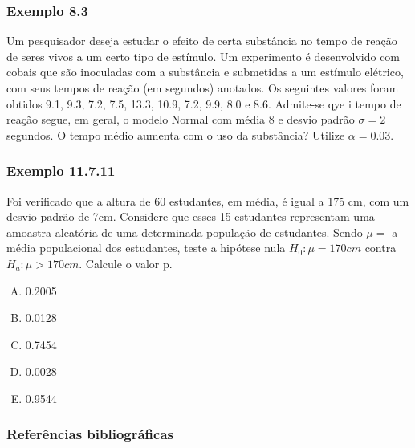 \documentclass[11pt]{beamer}
\begin{document}
\begin{frame}
\frametitle{Exemplo 8.3}
Um pesquisador deseja estudar o efeito de certa substância no tempo de reação de seres vivos a um certo tipo de estímulo. Um experimento é desenvolvido com cobais que são inoculadas com a substância e submetidas a um estímulo elétrico, com seus tempos de reação (em segundos) anotados. Os seguintes valores foram obtidos 9.1, 9.3, 7.2, 7.5, 13.3, 10.9, 7.2, 9.9, 8.0 e 8.6. Admite-se qye i tempo de reação segue, em geral, o modelo Normal com média 8 e desvio padrão \(\sigma =2\) segundos. O tempo médio aumenta com o uso da substância? Utilize \(\alpha=0.03\).
\vspace{1in}
\vspace{1in}

\end{frame}

\begin{frame}
\frametitle{Exemplo 11.7.11}
Foi verificado que a altura de 60 estudantes, em média, é igual a 175 cm, com um desvio padrão de 7cm. Considere que esses 15 estudantes representam uma amoastra aleatória de uma determinada população de estudantes. Sendo \(\mu=\) a média populacional dos estudantes, teste a hipótese nula \(H_0:\mu=170cm\) contra \(H_a:\mu>170cm\). Calcule o valor p. 
\begin{enumerate}[A)]
\item 0.2005
\item 0.0128
\item 0.7454
\item 0.0028
\item 0.9544
\end{enumerate}

\end{frame}


\begin{frame}
\frametitle{Referências bibliográficas}
\printbibliography
\end{frame}
\end{document}
